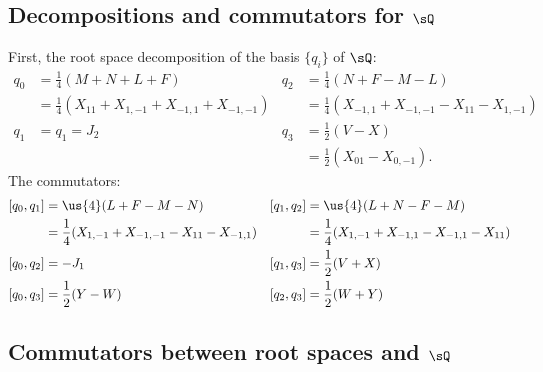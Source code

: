 \subsection{Decompositions and commutators for \texorpdfstring{$\sQ$}{Q}}

First, the root space decomposition of the basis $\{q_i\}$ of $\sQ$:
\begin{subequations}
\begin{align} 
	q_0	&=\frac{1}{ 4 }(M+N+L+F)				&	q_2	&=\frac{1}{ 4 }(N+F-M-L)\\
		&=\frac{1}{ 4 }(X_{11}+X_{1,-1}+X_{-1,1}+X_{-1,-1})	&		&=\frac{1}{ 4 }(X_{-1,1}+X_{-1,-1}-X_{11}-X_{1,-1})\\
	q_1	&=q_1=J_2						&	q_3	&=\frac{1}{2}(V-X)\\
		&							&		&=\frac{ 1 }{2}(X_{01}-X_{0,-1}).
\end{align}
\end{subequations}
The commutators:
\begin{subequations}
\begin{align} 
[q_0,q_1]&=\us{4}(L+F-M-N) &[q_1,q_2]&=\us{4}(L+N-F-M)\\\
&=\frac{1}{ 4 }(X_{1,-1}+X_{-1,-1}-X_{11}-X_{-1,1})	&&=\frac{1}{ 4 }(X_{1,-1}+X_{-1,1}-X_{-1,1}-X_{11})\\
[q_0,q_2]&=-J_1            &[q_1,q_3]&=\frac{1}{2}(V+X)\\
[q_0,q_3]&=\frac{1}{2}(Y-W)      &[q_2,q_3]&=\frac{1}{2}(W+Y)
\end{align}
\end{subequations}

\subsection{Commutators between root spaces and \texorpdfstring{$\sQ$}{Q}}

